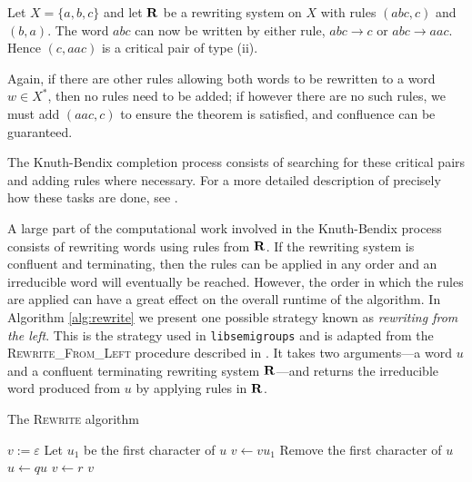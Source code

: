 \begin{example}
  Let $X=\{a,b,c\}$ and let $\mathbf{R}$ be a rewriting system on $X$ with rules
  $(abc, c)$ and $(b, a)$.  The word $abc$ can now be written by either rule,
  $abc \to c$ or $abc \to aac$.  Hence $(c, aac)$ is a critical pair of type
  (ii).

  Again, if there are other rules allowing both words to be rewritten to a word
  $w \in X^*$, then no rules need to be added; if however there are no such
  rules, we must add $(aac, c)$ to ensure the theorem is satisfied, and
  confluence can be guaranteed.
\end{example}

The Knuth-Bendix completion process consists of searching for these critical
pairs and adding rules where necessary.  For a more detailed description of
precisely how these tasks are done, see \cite[\S 2.6]{sims}.

A large part of the computational work involved in the Knuth-Bendix process
consists of rewriting words using rules from $\mathbf{R}$.  If the rewriting system is
confluent and terminating, then the rules can be applied in any order and an
irreducible word will eventually be reached.  However, the order in which the
rules are applied can have a great effect on the overall runtime of the
algorithm.  In Algorithm \ref{alg:rewrite} we present one possible strategy
known as \textit{rewriting from the left}.  This is the strategy used in
\texttt{libsemigroups} \cite{libsemigroups} and is adapted from the
\textsc{Rewrite\_From\_Left} procedure described in \cite[\S 2.4]{sims}.  It
takes two arguments---a word $u$ and a confluent terminating rewriting system
$\mathbf{R}$---and returns the irreducible word produced from $u$ by applying rules in
$\mathbf{R}$.

\begin{algorithm}
\caption{The \textsc{Rewrite} algorithm}
\label{alg:rewrite}
\begin{algorithmic}[1]
\State $v := \varepsilon$
  \State Let $u_1$ be the first character of $u$
  \State $v \gets v u_1$
  \State Remove the first character of $u$
      \State $u \gets qu$
      \State $v \gets r$
      \State \Break
    \EndIf
  \EndFor
\EndWhile
\State \Return $v$
\EndProcedure
\end{algorithmic}
\end{algorithm}

